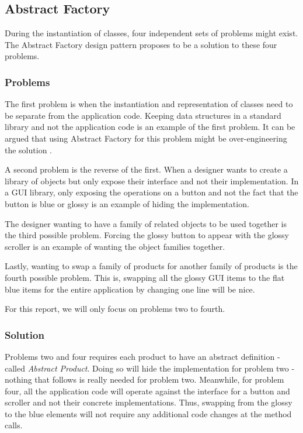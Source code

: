 \subsection{Abstract Factory}
During the instantiation of classes, four independent sets of problems might exist.
The Abstract Factory design pattern proposes to be a solution to these four problems. \cite{gamma_94_01}

\subsubsection{Problems}
The first problem is when the instantiation and representation of classes need to be separate from the application code.
Keeping data structures in a standard library and not the application code is an example of the first problem.
It can be argued that using Abstract Factory for this problem might be over-engineering the solution \cite{kerievsky_05_01}.

A second problem is the reverse of the first.
When a designer wants to create a library of objects but only expose their interface and not their implementation.
In a GUI library, only exposing the operations on a button and not the fact that the button is blue or glossy is an example of hiding the implementation.

The designer wanting to have a family of related objects to be used together is the third possible problem.
Forcing the glossy button to appear with the glossy scroller is an example of wanting the object families together.

Lastly, wanting to swap a family of products for another family of products is the fourth possible problem.
This is, swapping all the glossy GUI items to the flat blue items for the entire application by changing one line will be nice.

For this report, we will only focus on problems two to fourth.

\subsubsection{Solution}
Problems two and four requires each product to have an abstract definition - called \textit{Abstract Product}.
Doing so will hide the implementation for problem two - nothing that follows is really needed for problem two.
Meanwhile, for problem four, all the application code will operate against the interface for a button and scroller and not their concrete implementations.
Thus, swapping from the glossy to the blue elements will not require any additional code changes at the method calls.

